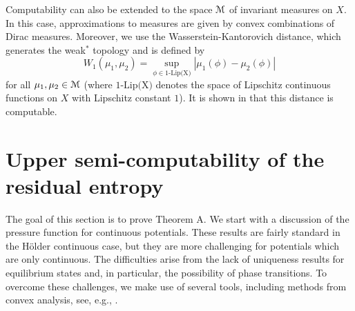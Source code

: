 \documentclass[11pt, reqno]{amsart}
\newcommand{\cM}{\EuScript{M}}
\begin{document}
Computability can also be extended to the space $\cM$ of invariant measures on $X$.  In this case, approximations to measures are given by convex combinations of Dirac measures.  Moreover, we use the Wasserstein-Kantorovich distance, which generates the weak$^\ast$ topology and is defined by
$$
W_1(\mu_1,\mu_2)=\sup_{\phi\in1\text{-Lip(X)}}\left|\mu_1(\phi)-\mu_2(\phi)\right|
$$
for all $\mu_1,\mu_2\in \cM$ (where $\text{1-Lip(X)}$ denotes the space of Lipschitz continuous functions on $X$ with Lipschitz constant $1$).  It is shown in \cite{GHR} that this distance is computable.










\section{Upper semi-computability of the residual entropy}\label{sec:3}
The goal of this section is to prove Theorem A. We start with a discussion of the pressure function for continuous potentials. These results are fairly standard in the H\"older continuous case, but they are more challenging for potentials which are only continuous.  The difficulties arise from the lack of uniqueness results for equilibrium states and, in particular, the possibility of phase transitions.  To overcome these challenges, we make use of several tools, including methods from convex analysis, see, e.g., \cite{R}. 
\end{document}
